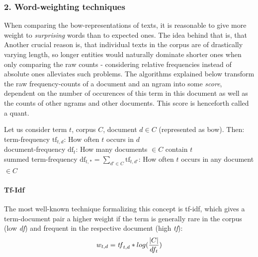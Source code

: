 \subsubsection{2. Word-weighting techniques}
\label{sec:word_count_techniques}

When comparing the \gls{bow}-representations of texts, it is reasonable to give more weight to \emph{surprising} words than to expected ones. The idea behind that is, that  \cite[156]{Turney2010} Another crucial reason is, that individual texts in the corpus are of drastically varying length, so longer entities would naturally dominate shorter ones when only comparing the raw counts - considering relative frequencies instead of absolute ones alleviates such problems. The algorithms explained below transform the raw frequency-counts of a document and an \gls{ngram} into some \emph{score}, dependent on the number of occurences of this term in this document as well as the counts of other \glspl{ngram} and other documents. This score is henceforth called a \gls{quant}.

Let us consider term $t$, corpus $C$, document $d \in C$ (represented as \gls{bow}). Then:\\
term-frequency $\text{tf}_{t,d}$: How often $t$ occurs in $d$\\
document-frequency $\text{df}_t$: How many documents $\in C$ contain $t$\\
summed term-frequency $\text{df}_{t,*} = \sum_{d' \in C} \text{tf}_{t,d'}$: How often $t$ occurs in any document $\in C$

\paragraph{Tf-Idf} The most well-known technique formalizing this concept is \gls{tf-idf}, which gives a term-document pair a higher weight if the term is generally rare in the corpus (low \textit{df}) and frequent in the respective document (high \textit{tf}):
\vspace{-2.3ex}
$$ w_{t,d} = \text{\textit{tf}}_{t,d} * log(\frac{|C|}{df_t}) $$


